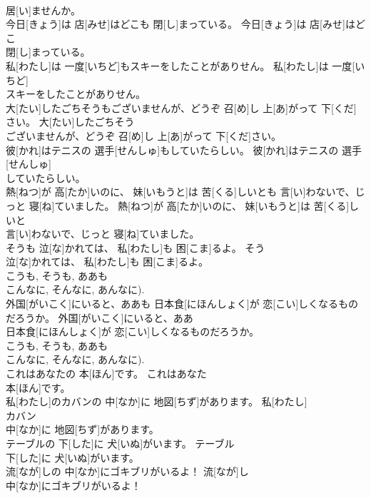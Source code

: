 \documentclass[8pt]{extreport}
\begin{document}
\begin{CJK}{UTF8}{min}
\\	居[い]ませんか。	
\\	今日[きょう]は 店[みせ]はどこも 閉[し]まっている。	今日[きょう]は 店[みせ]はどこ
\\	閉[し]まっている。	
\\	私[わたし]は 一度[いちど]もスキーをしたことがありせん。	私[わたし]は 一度[いちど]
\\	スキーをしたことがありせん。	
\\	大[たい]したごちそうもございませんが、どうぞ 召[め]し 上[あ]がって 下[くだ]さい。	大[たい]したごちそう
\\	ございませんが、どうぞ 召[め]し 上[あ]がって 下[くだ]さい。	
\\	彼[かれ]はテニスの 選手[せんしゅ]もしていたらしい。	彼[かれ]はテニスの 選手[せんしゅ]
\\	していたらしい。	
\\	熱[ねつ]が 高[たか]いのに、 妹[いもうと]は 苦[くる]しいとも 言[い]わないで、じっと 寝[ね]ていました。	熱[ねつ]が 高[たか]いのに、 妹[いもうと]は 苦[くる]しいと
\\	言[い]わないで、じっと 寝[ね]ていました。	
\\	そうも 泣[な]かれては、 私[わたし]も 困[こま]るよ。	そう
\\	泣[な]かれては、 私[わたし]も 困[こま]るよ。	
\\	こうも, そうも, ああも 
\\	こんなに, そんなに, あんなに).
\\	外国[がいこく]にいると、ああも 日本食[にほんしょく]が 恋[こい]しくなるものだろうか。	外国[がいこく]にいると、ああ
\\	日本食[にほんしょく]が 恋[こい]しくなるものだろうか。	
\\	こうも, そうも, ああも 
\\	こんなに, そんなに, あんなに).
\\	これはあなたの 本[ほん]です。	これはあなた
\\	本[ほん]です。	
\\	私[わたし]のカバンの 中[なか]に 地図[ちず]があります。	私[わたし]
\\	カバン
\\	中[なか]に 地図[ちず]があります。	
\\	テーブルの 下[した]に 犬[いぬ]がいます。	テーブル
\\	下[した]に 犬[いぬ]がいます。	
\\	流[なが]しの 中[なか]にゴキブリがいるよ！	流[なが]し
\\	中[なか]にゴキブリがいるよ！	

\end{CJK}
\end{document}
